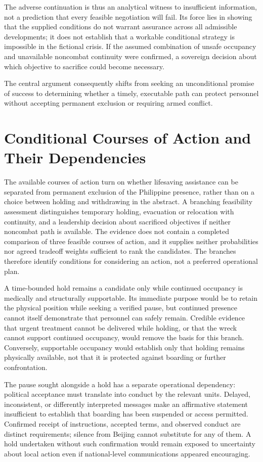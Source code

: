 \documentclass[11pt]{article}
\begin{document}
The adverse continuation is thus an analytical witness to insufficient information, not a prediction that every feasible negotiation will fail. Its force lies in showing that the supplied conditions do not warrant assurance across all admissible developments; it does not establish that a workable conditional strategy is impossible in the fictional crisis. If the assumed combination of unsafe occupancy and unavailable noncombat continuity were confirmed, a sovereign decision about which objective to sacrifice could become necessary.

The central argument consequently shifts from seeking an unconditional promise of success to determining whether a timely, executable path can protect personnel without accepting permanent exclusion or requiring armed conflict.

\section{Conditional Courses of Action and Their Dependencies}
The available courses of action turn on whether lifesaving assistance can be separated from permanent exclusion of the Philippine presence, rather than on a choice between holding and withdrawing in the abstract. A branching feasibility assessment distinguishes temporary holding, evacuation or relocation with continuity, and a leadership decision about sacrificed objectives if neither noncombat path is available. The evidence does not contain a completed comparison of three feasible courses of action, and it supplies neither probabilities nor agreed tradeoff weights sufficient to rank the candidates. The branches therefore identify conditions for considering an action, not a preferred operational plan.

A time-bounded hold remains a candidate only while continued occupancy is medically and structurally supportable. Its immediate purpose would be to retain the physical position while seeking a verified pause, but continued presence cannot itself demonstrate that personnel can safely remain. Credible evidence that urgent treatment cannot be delivered while holding, or that the wreck cannot support continued occupancy, would remove the basis for this branch. Conversely, supportable occupancy would establish only that holding remains physically available, not that it is protected against boarding or further confrontation.

The pause sought alongside a hold has a separate operational dependency: political acceptance must translate into conduct by the relevant units. Delayed, inconsistent, or differently interpreted messages make an affirmative statement insufficient to establish that boarding has been suspended or access permitted. Confirmed receipt of instructions, accepted terms, and observed conduct are distinct requirements; silence from Beijing cannot substitute for any of them. A hold undertaken without such confirmation would remain exposed to uncertainty about local action even if national-level communications appeared encouraging.
\end{document}

